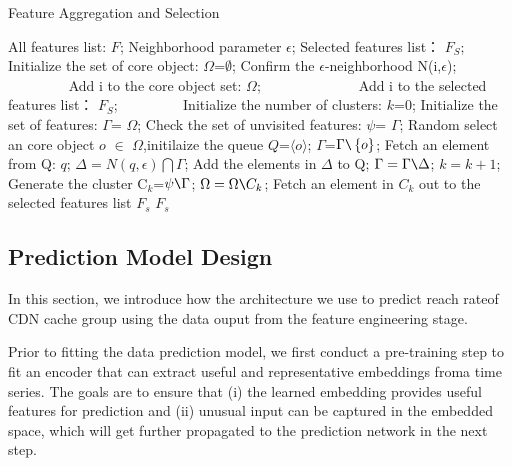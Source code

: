 \documentclass[5p]{elsarticle}
\newcommand{\dabiaolv}{reach rate}
\begin{document}
\begin{algorithm}[t]
\caption{Feature Aggregation and Selection} 
\begin{algorithmic}[1]
\Require  
    All features list: $F$;
    Neighborhood parameter $\epsilon$; 
\Ensure  
    Selected features list： $F_S$;  
\State Initialize the set of core object:  $\Omega$=$\emptyset$;
    \State Confirm the $\epsilon$-neighborhood\; N(i,$\epsilon$);
　　　　        \State Add i to the core object set: $\Omega$;
　　        \Else
　　　　        \State Add i to the selected features list： $F_S$;
　　　　    \EndIf
\EndFor
\State Initialize the number of clusters:  $k$=0;
\State Initialize the set of features:  $\Gamma$= $\Omega$;
\While{$\Omega\neq\emptyset$}
\State Check the set of unvisited features: $\psi$= $\Gamma$;
    \State Random select an core object $o$ $\in$ $\Omega$,initilaize the queue $Q$=$\langle o \rangle$;
\State $\Gamma$=$\Gamma \verb|\|\left\{o\right\}$;
    \State Fetch an element from Q: $q$;
    \State $\Delta=N(q,\epsilon)\bigcap\Gamma$;
    \State Add the elements in $\Delta$ to Q;
    \State  $\Gamma= \Gamma\verb|\|\Delta$;
\EndWhile
\State $k=k+1$;
\State Generate the cluster C$_k$=$\psi\verb|\|\Gamma$;
\State $\Omega=\Omega\verb|\|C_k$;
\EndWhile
{}
    \State Fetch an element in $C_k$ out to the selected features list $F_s$
\EndFor
\State \Return $F_s$
\end{algorithmic}
\end{algorithm}


\subsection{Prediction Model Design}

In this section, we introduce how the architecture we use to predict \dabiaolv of CDN cache group using the data ouput from the feature engineering stage. 

Prior to fitting the data prediction model, we first conduct a pre-training step to fit an encoder that can extract useful and representative embeddings froma  time  series.  The  goals  are  to  ensure  that  (i)  the  learned embedding  provides  useful  features  for  prediction  and  (ii) unusual input can be captured in the embedded space, which will get further propagated to the prediction network in the next step.
\end{document}
